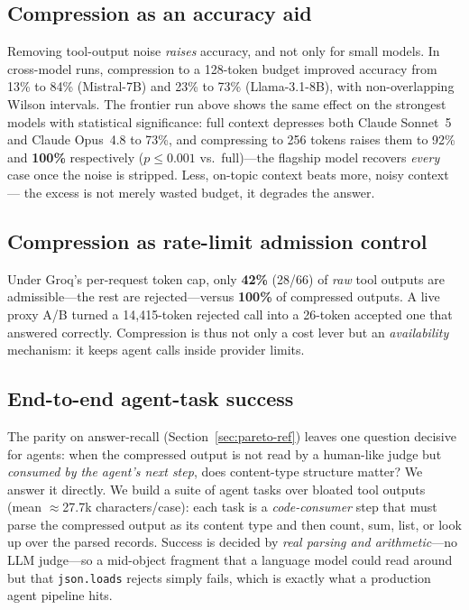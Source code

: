 \documentclass[11pt]{article}
\begin{document}
\subsection{Compression as an accuracy aid}
Removing tool-output noise \emph{raises} accuracy, and not only for small
models. In cross-model runs, compression to a 128-token budget improved accuracy
from 13\% to 84\% (Mistral-7B) and 23\% to 73\% (Llama-3.1-8B), with
non-overlapping Wilson intervals. The frontier run above shows the same effect on
the strongest models with statistical significance: full context depresses both
Claude Sonnet~5 and Claude Opus~4.8 to 73\%, and compressing to 256 tokens raises
them to 92\% and \textbf{100\%} respectively ($p{\leq}0.001$ vs.\ full)---the
flagship model recovers \emph{every} case once the noise is stripped. Less,
on-topic context beats more, noisy context --- the excess is not merely wasted
budget, it degrades the answer.

\subsection{Compression as rate-limit admission control}
Under Groq's per-request token cap, only \textbf{42\%} (28/66) of \emph{raw} tool
outputs are admissible---the rest are rejected---versus \textbf{100\%} of
compressed outputs. A live proxy A/B turned a 14{,}415-token rejected call into a
26-token accepted one that answered correctly. Compression is thus not only a
cost lever but an \emph{availability} mechanism: it keeps agent calls inside
provider limits.

\subsection{End-to-end agent-task success}
\label{sec:agenttasks}
The parity on answer-recall (Section~\ref{sec:pareto-ref}) leaves one question
decisive for agents: when the compressed output is not read by a human-like judge
but \emph{consumed by the agent's next step}, does content-type structure matter?
We answer it directly. We build a suite of agent tasks over bloated tool outputs
(mean $\approx$27.7k characters/case): each task is a \emph{code-consumer} step
that must parse the compressed output as its content type and then count, sum,
list, or look up over the parsed records. Success is decided by \emph{real
parsing and arithmetic}---no LLM judge---so a mid-object fragment that a language
model could read around but that \texttt{json.loads} rejects simply fails, which
is exactly what a production agent pipeline hits.
\end{document}
